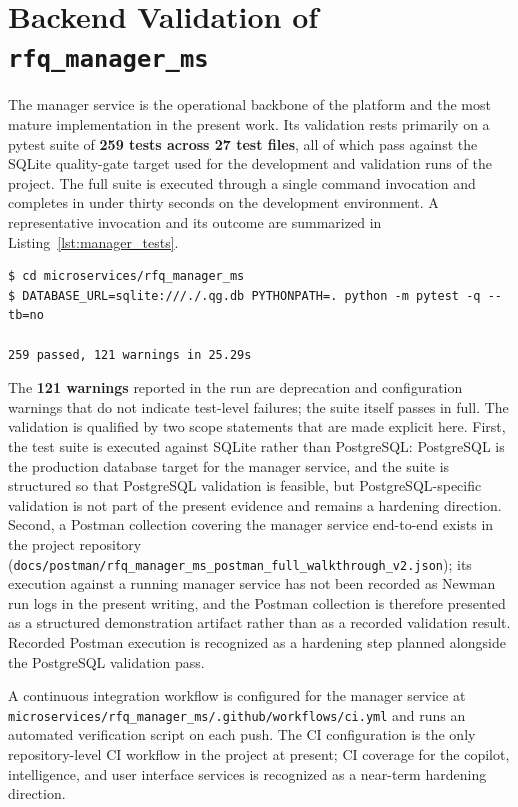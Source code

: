 \section{Backend Validation of \texttt{rfq\_manager\_ms}}
The manager service is the operational backbone of the platform and the most mature implementation in the present work. Its validation rests primarily on a pytest suite of \textbf{259 tests across 27 test files}, all of which pass against the SQLite quality-gate target used for the development and validation runs of the project. The full suite is executed through a single command invocation and completes in under thirty seconds on the development environment. A representative invocation and its outcome are summarized in Listing~\ref{lst:manager_tests}.

\begin{lstlisting}[caption={Manager service pytest invocation and outcome.}, label={lst:manager_tests}, basicstyle=\ttfamily\small, frame=single, breaklines=true]
$ cd microservices/rfq_manager_ms
$ DATABASE_URL=sqlite:///./.qg.db PYTHONPATH=. python -m pytest -q --tb=no

259 passed, 121 warnings in 25.29s
\end{lstlisting}

The \textbf{121 warnings} reported in the run are deprecation and configuration warnings that do not indicate test-level failures; the suite itself passes in full. The validation is qualified by two scope statements that are made explicit here. First, the test suite is executed against SQLite rather than PostgreSQL: PostgreSQL is the production database target for the manager service, and the suite is structured so that PostgreSQL validation is feasible, but PostgreSQL-specific validation is not part of the present evidence and remains a hardening direction. Second, a Postman collection covering the manager service end-to-end exists in the project repository (\texttt{docs/postman/rfq\_manager\_ms\_postman\_full\_walkthrough\_v2.json}); its execution against a running manager service has not been recorded as Newman run logs in the present writing, and the Postman collection is therefore presented as a structured demonstration artifact rather than as a recorded validation result. Recorded Postman execution is recognized as a hardening step planned alongside the PostgreSQL validation pass.

A continuous integration workflow is configured for the manager service at \texttt{microservices/rfq\_manager\_ms/.github/workflows/ci.yml} and runs an automated verification script on each push. The CI configuration is the only repository-level CI workflow in the project at present; CI coverage for the copilot, intelligence, and user interface services is recognized as a near-term hardening direction.

